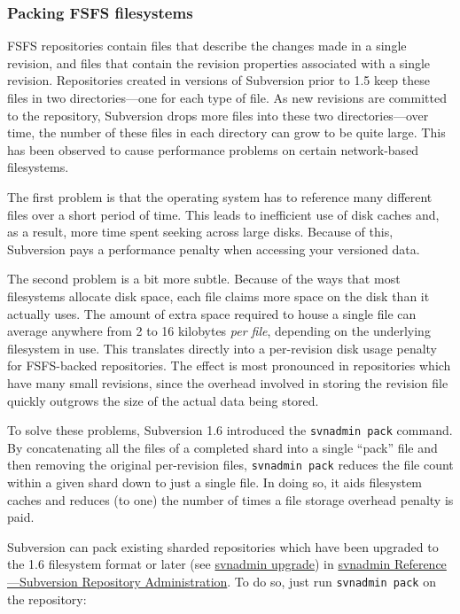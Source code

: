 \subsubsection{Packing FSFS
filesystems}\label{svn.reposadmin.maint.diskspace.fsfspacking}

FSFS repositories contain files that describe the changes made in a
single revision, and files that contain the revision properties
associated with a single revision. Repositories created in versions of
Subversion prior to 1.5 keep these files in two directories---one for
each type of file. As new revisions are committed to the repository,
Subversion drops more files into these two directories---over time, the
number of these files in each directory can grow to be quite large. This
has been observed to cause performance problems on certain network-based
filesystems.

The first problem is that the operating system has to reference many
different files over a short period of time. This leads to inefficient
use of disk caches and, as a result, more time spent seeking across
large disks. Because of this, Subversion pays a performance penalty when
accessing your versioned data.

The second problem is a bit more subtle. Because of the ways that most
filesystems allocate disk space, each file claims more space on the disk
than it actually uses. The amount of extra space required to house a
single file can average anywhere from 2 to 16 kilobytes \emph{per file},
depending on the underlying filesystem in use. This translates directly
into a per-revision disk usage penalty for FSFS-backed repositories. The
effect is most pronounced in repositories which have many small
revisions, since the overhead involved in storing the revision file
quickly outgrows the size of the actual data being stored.

To solve these problems, Subversion 1.6 introduced the
\texttt{svnadmin\ pack} command. By concatenating all the files of a
completed shard into a single ``pack'' file and then removing the
original per-revision files, \texttt{svnadmin\ pack} reduces the file
count within a given shard down to just a single file. In doing so, it
aids filesystem caches and reduces (to one) the number of times a file
storage overhead penalty is paid.

Subversion can pack existing sharded repositories which have been
upgraded to the 1.6 filesystem format or later (see
\hyperref[svn.ref.svnadmin.c.upgrade]{svnadmin upgrade}) in
\hyperref[svn.ref.svnadmin]{svnadmin Reference---Subversion Repository
Administration}. To do so, just run \texttt{svnadmin\ pack} on the
repository:

